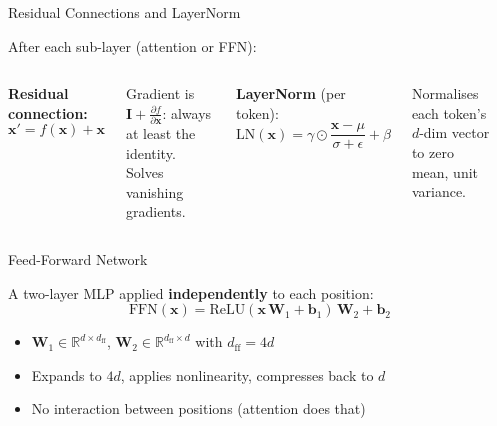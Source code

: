 \documentclass[aspectratio=169, professionalfonts]{beamer}
\def\R{\mathbb{R}}
\begin{document}
\begin{frame}{Residual Connections and LayerNorm}

After each sub-layer (attention or FFN):

\begin{columns}[c]

\textbf{Residual connection:}
$$\mathbf{x}' = f(\mathbf{x}) + \mathbf{x}$$

Gradient is $\mathbf{I} + \frac{\partial f}{\partial\mathbf{x}}$:
always at least the identity. Solves vanishing gradients.

\bigskip

\textbf{LayerNorm} (per token):
$$\text{LN}(\mathbf{x})
  = \gamma \odot \frac{\mathbf{x}-\mu}{\sigma+\epsilon} + \beta$$

Normalises each token's $d$-dim vector to zero mean, unit variance.

\begin{center}
\end{center}
\end{columns}

\end{frame}

\begin{frame}{Feed-Forward Network}

A two-layer MLP applied \textbf{independently} to each position:
$$\text{FFN}(\mathbf{x})
  = \text{ReLU}(\mathbf{x}\,\mathbf{W}_1 + \mathbf{b}_1)\,
    \mathbf{W}_2 + \mathbf{b}_2$$

\begin{itemize}
  \item $\mathbf{W}_1 \in \R^{d \times d_\text{ff}}$,
        $\mathbf{W}_2 \in \R^{d_\text{ff} \times d}$
        with $d_\text{ff} = 4d$
  \item Expands to $4d$, applies nonlinearity, compresses back to $d$
  \item No interaction between positions (attention does that)
\end{itemize}

\end{frame}
\end{document}
